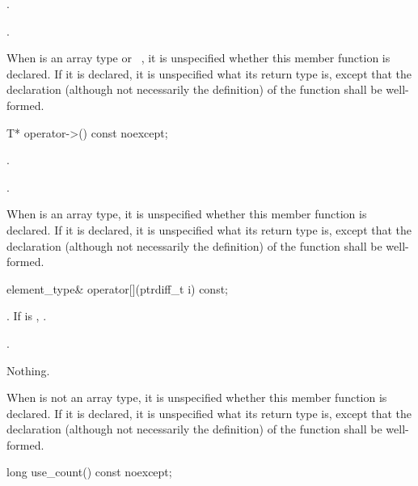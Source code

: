 \begin{itemdescr}
\pnum
\expects
{}.

\pnum
\returns
{}.

\pnum
\remarks
When  is an array type or \cv{}~,
it is unspecified whether this
member function is declared. If it is declared, it is unspecified what its
return type is, except that the declaration (although not necessarily the
definition) of the function shall be well-formed.
\end{itemdescr}

%
\begin{itemdecl}
T* operator->() const noexcept;
\end{itemdecl}

\begin{itemdescr}
\pnum
\expects
{}.

\pnum
\returns
{}.

\pnum
\remarks
When  is an array type,
it is unspecified whether this member function is declared.
If it is declared, it is unspecified what its return type is,
except that the declaration (although not necessarily the definition)
of the function shall be well-formed.
\end{itemdescr}

%
\begin{itemdecl}
element_type& operator[](ptrdiff_t i) const;
\end{itemdecl}

\begin{itemdescr}
\pnum
\expects
{}.
If  is , .

\pnum
\returns
{}.

\pnum
\throws
Nothing.

\pnum
\remarks
When  is not an array type,
it is unspecified whether this member function is declared.
If it is declared, it is unspecified what its return type is,
except that the declaration (although not necessarily the definition)
of the function shall be well-formed.
\end{itemdescr}

%
\begin{itemdecl}
long use_count() const noexcept;
\end{itemdecl}

